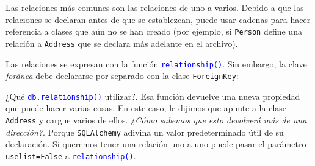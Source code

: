 \documentclass[10pt,letterpaper,notumble]{leaflet}
\begin{document}
{\begin{minipage}{2.2\linewidth}
		    Las relaciones más comunes son las relaciones de uno a varios. Debido a que las relaciones se declaran antes de que se establezcan, puede usar cadenas para hacer referencia a clases que aún no se han creado (por ejemplo, si \texttt{Person} define una relación a \texttt{Address} que se declara más adelante en el archivo).
		    
		    Las relaciones se expresan con la función \texttt{\textcolor{blue}{relationship()}}. Sin embargo, la clave \textit{foránea} debe declararse por separado con la clase \texttt{ForeignKey}:
		    
		    
		    
		    ¿Qué \texttt{\textcolor{blue}{db.relationship()}} utilizar?. Esa función devuelve una nueva propiedad que puede hacer varias cosas. En este caso, le dijimos que apunte a la clase \texttt{Address} y cargue varios de ellos. \textit{¿Cómo sabemos que esto devolverá más de una dirección?}. Porque \texttt{SQLAlchemy} adivina un valor predeterminado útil de su declaración. Si queremos tener una relación uno-a-uno puede pasar el parámetro \texttt{uselist=False} a \texttt{\textcolor{blue}{relationship()}}.
		\end{minipage}
		
	}
	
\end{document}
